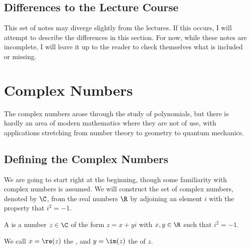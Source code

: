 \documentclass[a4]{scrreprt}
\begin{document}
\section{Differences to the Lecture Course}

This set of notes may diverge slightly from the lectures. If this occurs, I will attempt to describe the differences in this section.
For now, while these notes are incomplete, I will leave it up to the reader to check themselves what is included or missing.  




\chapter{Complex Numbers}

The complex numbers arose through the study of polynomials, but there is hardly an area of modern mathematics where they are not of use, with applications stretching from number theory to geometry to quantum mechanics.





\section{Defining the Complex Numbers}

We are going to start right at the beginning, though some familiarity with complex numbers is assumed.
We will construct the set of complex numbers, denoted by $\C$, from the real numbers $\R$ by adjoining an element $i$ with the property that $i^2 = -1$.

\begin{definition}
	A  is a number $z \in \C$ of the form $z = x + yi$ with $x, y \in \R$ such that $i^2 = -1$. 
	
	We call $x = \re(z)$ the , and $y = \im(z)$ the  of $z$.
\end{definition}
\end{document}
